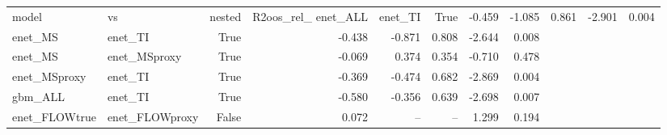 \begin{tabular}{llrrrrrr}
\toprule
model & vs & nested & R2oos_rel_%
\midrule
enet_ALL & enet_TI & True & -0.459 & -1.085 & 0.861 & -2.901 & 0.004 \\
enet_MS & enet_TI & True & -0.438 & -0.871 & 0.808 & -2.644 & 0.008 \\
enet_MS & enet_MSproxy & True & -0.069 & 0.374 & 0.354 & -0.710 & 0.478 \\
enet_MSproxy & enet_TI & True & -0.369 & -0.474 & 0.682 & -2.869 & 0.004 \\
gbm_ALL & enet_TI & True & -0.580 & -0.356 & 0.639 & -2.698 & 0.007 \\
enet_FLOWtrue & enet_FLOWproxy & False & 0.072 & -- & -- & 1.299 & 0.194 \\
\bottomrule
\end{tabular}
